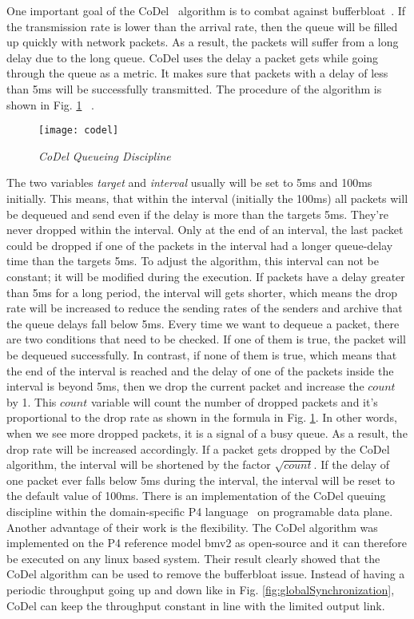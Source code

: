 One important goal of the CoDel~\cite{nichols2013controlled} algorithm is to combat against bufferbloat~\cite{gettys2012bufferbloat}. If the transmission rate is lower than the arrival rate, then the queue will be filled up quickly with network packets. As a result, the packets will suffer from a long delay due to the long queue. CoDel uses the delay a packet gets while going through the queue as a metric. It makes sure that packets with a delay of less than 5ms will be successfully transmitted. The procedure of the algorithm is shown in Fig. \ref{fig:codel} ~\cite{AQM_Algorithm}. 
\begin{figure}[htbp]
\centering
\texttt{[image: codel]}
\caption{\em CoDel Queueing Discipline}
\label{fig:codel}
\end{figure}
The two variables \textit{target} and \textit{interval} usually will be set to 5ms and 100ms initially. This means, that within the interval (initially the 100ms) all packets will be dequeued and send even if the delay is more than the targets 5ms. They're never dropped within the interval. Only at the end of an interval, the last packet could be dropped if one of the packets in the interval had a longer queue-delay time than the targets 5ms. To adjust the algorithm, this interval can not be constant; it will be modified during the execution. If packets have a delay greater than 5ms for a long period, the interval will gets shorter, which means the drop rate will be increased to reduce the sending rates of the senders and archive that the queue delays fall below 5ms. 
\newline Every time we want to dequeue a packet, there are two conditions that need to be checked. If one of them is true, the packet will be dequeued successfully. In contrast, if none of them is true, which means that the end of the interval is reached and the delay of one of the packets inside the interval is beyond 5ms, then we drop the current packet and increase the $count$ by 1. This $count$ variable will count the number of dropped packets and it's proportional to the drop rate as shown in the formula in Fig. \ref{fig:codel}. 
\newline In other words, when we see more dropped packets, it is a signal of a busy queue. As a result, the drop rate will be increased accordingly. If a packet gets dropped by the CoDel algorithm, the interval will be shortened by the factor $\sqrt{count}$. If the delay of one packet ever falls below 5ms during the interval, the interval will be reset to the default value of 100ms.
\newline There is an implementation of the CoDel queuing discipline within the domain-specific P4 language~\cite{bosshart2014p4} on programable data plane. Another advantage of their work is the flexibility. The CoDel algorithm was implemented on the P4 reference model bmv2 as open-source and it can therefore be executed on any linux based system. Their result clearly showed that the CoDel algorithm can be used to remove the bufferbloat issue. Instead of having a periodic throughput going up and down like in Fig. \ref{fig:globalSynchronization}, CoDel can keep the throughput constant in line with the limited output link.
